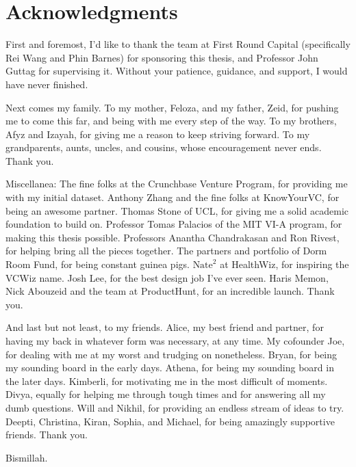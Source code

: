 % 

\cleardoublepage

\section*{Acknowledgments}

First and foremost, I'd like to thank the team at First Round Capital (specifically Rei Wang and Phin Barnes) for sponsoring this thesis, and Professor John Guttag for supervising it. Without your patience, guidance, and support, I would have never finished.

Next comes my family. To my mother, Feloza, and my father, Zeid, for pushing me to come this far, and being with me every step of the way. To my brothers, Afyz and Izayah, for giving me a reason to keep striving forward. To my grandparents, aunts, uncles, and cousins, whose encouragement never ends. Thank you.

Miscellanea: The fine folks at the Crunchbase Venture Program, for providing me with my initial dataset. Anthony Zhang and the fine folks at KnowYourVC, for being an awesome partner. Thomas Stone of UCL, for giving me a solid academic foundation to build on. Professor Tomas Palacios of the MIT VI-A program, for making this thesis possible. Professors Anantha Chandrakasan and Ron Rivest, for helping bring all the pieces together. The partners and portfolio of Dorm Room Fund, for being constant guinea pigs. $\text{Nate}^2$ at HealthWiz, for inspiring the VCWiz name. Josh Lee, for the best design job I've ever seen. Haris Memon, Nick Abouzeid and the team at ProductHunt, for an incredible launch. Thank you.

And last but not least, to my friends. Alice, my best friend and partner, for having my back in whatever form was necessary, at any time. My cofounder Joe, for dealing with me at my worst and trudging on nonetheless. Bryan, for being my sounding board in the early days. Athena, for being my sounding board in the later days. Kimberli, for motivating me in the most difficult of moments. Divya, equally for helping me through tough times and for answering all my dumb questions. Will and Nikhil, for providing an endless stream of ideas to try. Deepti, Christina, Kiran, Sophia, and Michael, for being amazingly supportive friends. Thank you.

Bismillah.

